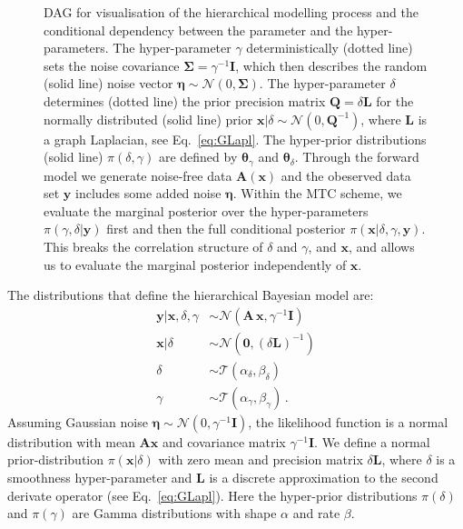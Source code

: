 \documentclass{article}
\begin{document}
\begin{figure}[htb!]
\begin{tikzpicture}
	\end{tikzpicture} 
	\caption[Directed acyclic graph for ozone retrieval and MTC scheme.]{DAG for visualisation of the hierarchical modelling process and the conditional dependency between the parameter and the hyper-parameters. The hyper-parameter $\gamma$ deterministically (dotted line) sets the noise covariance $\bm{\Sigma} = \gamma^{-1}\bm{I}$, which then describes the random (solid line) noise vector $\bm{\eta} \sim \mathcal{N}(0,\bm{\Sigma})$.
		The hyper-parameter $\delta$ determines (dotted line) the prior precision matrix $\bm{Q} = \delta \bm{L}$ for the normally distributed (solid line) prior $\bm{x}| \delta \sim \mathcal{N}(0, \bm{Q}^{-1})$, where $\bm{L}$ is a graph Laplacian, see Eq.~\ref{eq:GLapl}.
		The hyper-prior distributions (solid line) $\pi(\delta, \gamma)$ are defined by $\bm{\theta}_{\gamma}$ and $\bm{\theta}_{\delta}$.
		Through the forward model we generate noise-free data $\bm{A}(\bm{x})$ and the obeserved data set $\bm{y}$ includes some added noise $\bm{\eta}$.
		Within the MTC scheme, we evaluate the marginal posterior over the hyper-parameters $\pi(\gamma, \delta | \bm{y})$ first and then the full conditional posterior $\pi(\bm{x}|\delta,\gamma,\bm{y})$. This breaks the correlation structure of $\delta$ and $\gamma$, and $\bm{x}$, and allows us to evaluate the marginal posterior independently of $\bm{x}$.}
	\label{fig:DAGO3}
\end{figure}

The distributions that define the hierarchical Bayesian model are:
\begin{subequations}
	\begin{align}
		\bm{y} |  \bm{x},\delta, \gamma  &\sim \mathcal{N}(\bm{A} \, \bm{x}, \gamma^{-1} \bm{I}) \label{eq:likelihoodAppl} \\
		\bm{x}| \delta  &\sim \mathcal{N}(\bm{0}, (\delta \bm{L})^{-1} ) \label{eq:priorXAppl} \\
		\delta  &\sim \mathcal{T}(\alpha_{\delta}, \beta_{\delta})\label{eq:priorDelAppl} \\
		\gamma  &\sim \mathcal{T}(\alpha_{\gamma}, \beta_{\gamma})\label{eq:priorGamAppl} \, .
	\end{align} 
\end{subequations}
Assuming Gaussian noise $\bm{\eta} \sim \mathcal{N}(0, \gamma^{-1} \bm{I})$, the likelihood function is a normal distribution with mean $\bm{A} \bm{x}$ and covariance matrix $\gamma^{-1} \bm{I}$.
We define a normal prior-distribution $\pi(\bm{x}|\delta)$ with zero mean and precision matrix $\delta \bm{L}$, where $\delta$ is a smoothness hyper-parameter and $\bm{L}$ is a discrete approximation to the second derivate operator (see Eq.~\ref{eq:GLapl}).
Here the hyper-prior distributions $\pi(\delta)$ and $\pi(\gamma)$ are Gamma distributions with shape $\alpha$ and rate $\beta$.
\end{document}
